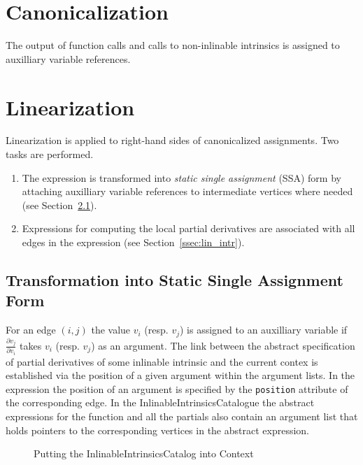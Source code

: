 \documentclass{book}
\newcommand{\sect}[1]{Section~#1}
\begin{document}
\section{Canonicalization}

The output of function calls and calls to non-inlinable intrinsics
is assigned to auxilliary variable references.

\section{Linearization}
\label{sec:linearization}

Linearization is applied to right-hand sides of canonicalized 
assignments. Two tasks are performed.
\begin{enumerate}
\item The expression is transformed into {\em static single
assignment} (SSA) form by attaching auxilliary variable references
to intermediate vertices where needed (see \sect{\ref{ssec:ssa}}).
\item Expressions for computing the local partial derivatives are
associated with all edges in the expression (see \sect{\ref{ssec:lin_intr}}).
\end{enumerate}

\subsection{Transformation into Static Single Assignment Form}
\label{ssec:ssa}

For an edge $(i,j)$ the value $v_i$ (resp. $v_j$) is assigned to an 
auxilliary variable if $\frac{\partial v_j}{\partial v_i}$ takes
$v_i$ (resp. $v_j$) as an argument. The link between the
abstract specification of partial derivatives of some inlinable
intrinsic and the current contex is established via the position
of a given argument within the argument lists. In the expression
the position of an argument is specified by the
{\tt position} attribute of the corresponding edge.
In the InlinableIntrinsicsCatalogue the abstract expressions
for the function and all the partials also contain an argument list
that holds pointers to the corresponding vertices in the abstract
expression. 

\begin{figure}
\centering {}
\caption{Putting the InlinableIntrinsicsCatalog into Context}
\label{fig:catalogmap}
\end{figure}
\end{document}
